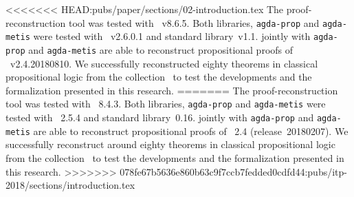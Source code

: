 \documentclass[../paper.tex]{subfiles}
\begin{document}
<<<<<<< HEAD:pubs/paper/sections/02-introduction.tex
The proof-reconstruction tool \Athena was tested with
~v8.6.5. Both libraries, \verb!agda-prop! and
\verb!agda-metis! were tested with \Agda~v2.6.0.1 and \Agda standard
library~v1.1. \Athena jointly with \verb!agda-prop! and
\verb!agda-metis! are able to reconstruct propositional proofs of
\Metis~v2.4.20180810. We successfully reconstructed eighty theorems in
classical propositional logic from the \TPTP
collection~\cite{Prieto-Cubides2017} to test the developments and the
formalization presented in this research.
=======
The proof-reconstruction tool \Athena was tested with ~8.4.3.
Both libraries, \verb!agda-prop! and \verb!agda-metis! were tested with
\Agda~2.5.4 and \Agda standard library~0.16.
\Athena jointly with \verb!agda-prop! and \verb!agda-metis! are able
to reconstruct propositional proofs of \Metis~2.4 (release~20180207).
We successfully reconstruct around eighty theorems in classical propositional
logic from the \TPTP collection~\cite{Prieto-Cubides2017} to test
the developments and the formalization presented in this research.
>>>>>>> 078fe67b5636e860b63c9f7ccb7fedded0cdfd44:pubs/itp-2018/sections/introduction.tex
\end{document}
